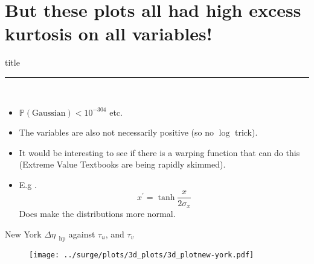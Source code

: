 \section{But these plots all had high excess kurtosis on all variables!  }
    \begin{frame}[plain]
        \vfill
      \centering
      \begin{beamercolorbox}[sep=8pt,center,shadow=true,rounded=true]{title}
        \insertsectionhead\par%
        \color{oxfordblue}\noindent\rule{10cm}{1pt} \\
        \begin{itemize}
        \item$\mathbb{P}(\mathrm{Gaussian})<10^{-304}$ etc.
        \item The variables are also not necessarily positive (so no $\log$ trick).
        \item It would be interesting to see if there is a warping function
         that can do this (Extreme Value Textbooks are being rapidly skimmed).
        \item E.g .       \begin{equation}
       x^{\prime} = \tanh{\frac{x}{2\sigma_x}} \text{}
       \end{equation}
       Does make the distributions more normal.
        \end{itemize}
      \end{beamercolorbox}
      \vfill
  \end{frame}


\begin{frame}{New York $\Delta\eta_{\;\;\mathrm{hp}}$ against $\tau_u$, and $\tau_v$}
\vspace{-30pt}
\hspace{-30pt}
 \begin{minipage}{1.1\textwidth}

\begin{figure}[htb!]
    \centering
   \hspace{-40pt} \texttt{[image: ../surge/plots/3d\_plots/3d\_plotnew-york.pdf]}
    \vspace{-15pt}
    \label{fig:A}
\end{figure}
\end{minipage}
\end{frame}


